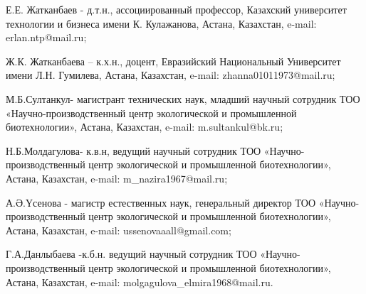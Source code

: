 \begin{authorinfo}
Е.Е. Жатканбаев - д.т.н., ассоциированный профессор, Казахский
университет технологии и бизнеса имени К. Кулажанова, Астана, Казахстан,
e-mail: erlan.ntp@mail.ru;

Ж.К. Жатканбаева -- к.х.н., доцент, Евразийский Национальный Университет
имени Л.Н. Гумилева, Астана, Казахстан, e-mail: zhanna01011973@mail.ru;

М.Б.Султанкул- магистрант технических наук, младший научный сотрудник
ТОО «Научно-производственный центр экологической и промышленной
биотехнологии», Астана, Казахстан, e-mail: m.sultankul@bk.ru;

Н.Б.Молдагулова- к.в.н, ведущий научный сотрудник ТОО
«Научно-производственный центр экологической и промышленной
биотехнологии», Астана, Казахстан, e-mail: m\_nazira1967@mail.ru;

А.Ә.Үсенова - магистр естественных наук, генеральный директор ТОО
«Научно-производственный центр экологической и промышленной
биотехнологии», Астана, Казахстан, e-mail: ussenovaaall@gmail.com;

Г.А.Данлыбаева -к.б.н. ведущий научный сотрудник ТОО
«Научно-производственный центр экологической и промышленной
биотехнологии», Астана, Казахстан, e-mail:
molgagulova\_elmira1968@mail.ru.
\end{authorinfo}
